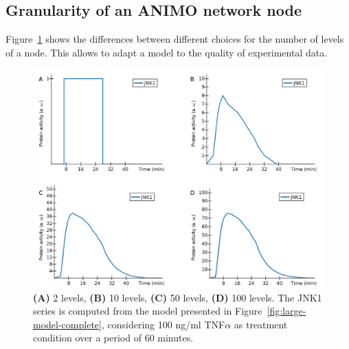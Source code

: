 \documentclass{bmcart}
\begin{document}
\subsection{Granularity of an ANIMO network node}
Figure~\ref{fig:levels} shows the differences between different choices for the
number of levels of a node. This allows to adapt a model to the quality of experimental data.

\begin{figure}[htpb]
\begin{minipage}{\textwidth}
\centering
  \includegraphics[width=\textwidth]{Figures/S3}
\caption{
{\bf(A)} 2 levels,
{\bf(B)} 10 levels,
{\bf (C)} 50 levels,
{\bf (D)} 100 levels.
The {\sf JNK1} series is computed from the model presented in Figure~\ref{fig:large-model-complete},
considering 100 ng/ml TNF$\alpha$ as treatment condition over a period of 60 minutes.}\label{fig:levels}
\end{minipage}
\end{figure}
\end{document}
